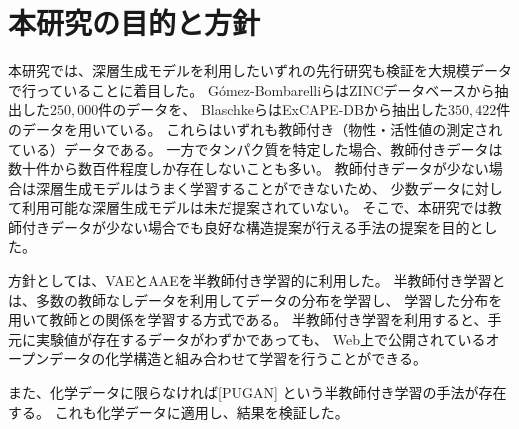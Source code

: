 \section{本研究の目的と方針}

本研究では、深層生成モデルを利用したいずれの先行研究も検証を大規模データで行っていることに着目した。
G\'{o}mez-Bombarelliら\cite{Gomez-Bombarelli2016}はZINCデータベースから抽出した$250,000$件のデータを、
Blaschkeら\cite{Blaschke2018}はExCAPE-DBから抽出した$350,422$件のデータを用いている。
これらはいずれも教師付き（物性・活性値の測定されている）データである。
一方でタンパク質を特定した場合、教師付きデータは数十件から数百件程度しか存在しないことも多い。
教師付きデータが少ない場合は深層生成モデルはうまく学習することができないため、
少数データに対して利用可能な深層生成モデルは未だ提案されていない。
そこで、本研究では教師付きデータが少ない場合でも良好な構造提案が行える手法の提案を目的とした。

方針としては、VAEとAAEを半教師付き学習的に利用した。
半教師付き学習とは、多数の教師なしデータを利用してデータの分布を学習し、
学習した分布を用いて教師との関係を学習する方式である。
半教師付き学習を利用すると、手元に実験値が存在するデータがわずかであっても、
Web上で公開されているオープンデータの化学構造と組み合わせて学習を行うことができる。

また、化学データに限らなければ[PUGAN] \cite{pugan}という半教師付き学習の手法が存在する。
これも化学データに適用し、結果を検証した。
